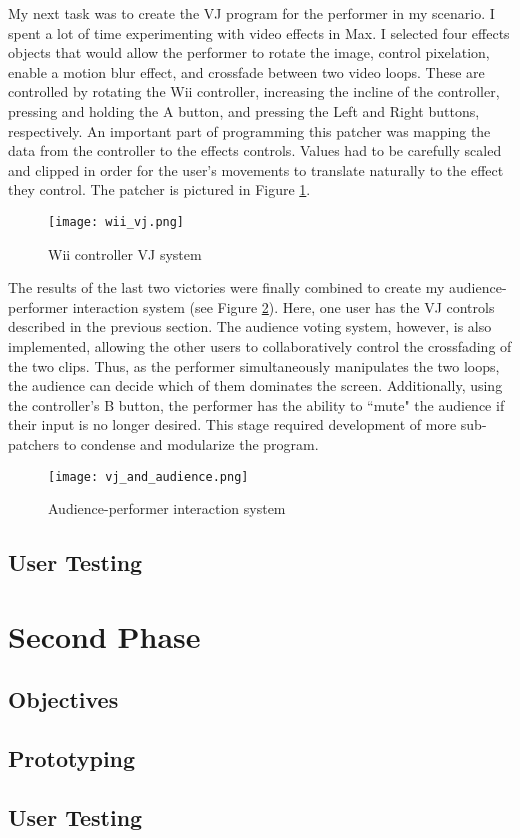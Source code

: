 My next task was to create the VJ program for the performer in my scenario. I spent a lot of time experimenting with video effects in Max. I selected four effects objects that would allow the performer to rotate the image, control pixelation, enable a motion blur effect, and crossfade between two video loops. These are controlled by rotating the Wii controller, increasing the incline of the controller, pressing and holding the A button, and pressing the Left and Right buttons, respectively. An important part of programming this patcher was mapping the data from the controller to the effects controls. Values had to be carefully scaled and clipped in order for the user's movements to translate naturally to the effect they control. The patcher is pictured in Figure \ref{prototyping5}.

\begin{figure}[t]
	\centering

	\texttt{[image: wii\_vj.png]}
	\caption{Wii controller VJ system}

	\label{prototyping5}
\end{figure}

The results of the last two victories were finally combined to create my audience-performer interaction system (see Figure \ref{prototyping6}). Here, one user has the VJ controls described in the previous section. The audience voting system, however, is also implemented, allowing the other users to collaboratively control the crossfading of the two clips. Thus, as the performer simultaneously manipulates the two loops, the audience can decide which of them dominates the screen. Additionally, using the controller's B button, the performer has the ability to ``mute" the audience if their input is no longer desired. This stage required development of more sub-patchers to condense and modularize the program.

\begin{figure}[t]
	\centering

	\texttt{[image: vj\_and\_audience.png]}
	\caption{Audience-performer interaction system}

	\label{prototyping6}
\end{figure}

\subsection{User Testing}

\section{Second Phase}

\subsection{Objectives}

\subsection{Prototyping}

\subsection{User Testing}